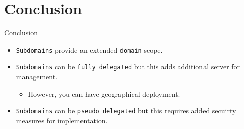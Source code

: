 \documentclass[xcolor=table]{beamer}
\begin{document}
\section*{Conclusion}
\begin{frame}{Conclusion}
  \begin{itemize}
    \item \texttt{Subdomains} provide an extended \texttt{domain} scope.
    \item \texttt{Subdomains} can be \texttt{fully delegated} but this adds additional server for management.
      \begin{itemize}
        \item However, you can have geographical deployment.
      \end{itemize}
    \item \texttt{Subdomains} can be \texttt{pseudo delegated} but this requires added secuirty measures for implementation.
  \end{itemize}
\end{frame}
\end{document}
